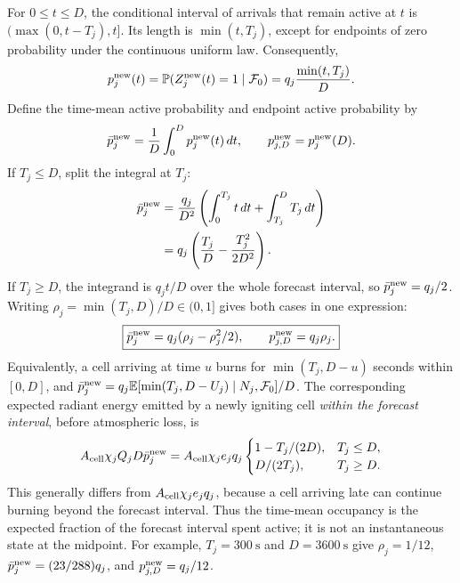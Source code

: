\documentclass[11pt,a4paper]{article}
\newcommand{\E}{\mathbb{E}}
\begin{document}
For $0\le t\le D$, the conditional interval of arrivals that remain active
at $t$ is $(\max(0,t-T_j),t]$. Its length is $\min(t,T_j)$, except for
endpoints of zero probability under the continuous uniform law. Consequently,
\begin{equation}
 p_j^{\rm new}(t)
 =\mathbb P(Z_j^{\rm new}(t)=1\mid\mathcal F_0)
 =q_j\frac{\min(t,T_j)}{D}.
 \label{eq:heat-instantaneous-occupancy}
\end{equation}
Define the time-mean active probability and endpoint active probability by
\begin{equation}
 \bar p_j^{\rm new}=\frac1D\int_0^D p_j^{\rm new}(t)\,dt,
 \qquad p_{j,D}^{\rm new}=p_j^{\rm new}(D).
\end{equation}
If $T_j\le D$, split the integral at $T_j$:
\begin{align}
 \bar p_j^{\rm new}
 &=\frac{q_j}{D^2}
      \left(\int_0^{T_j}t\,dt+\int_{T_j}^D T_j\,dt\right)\\
 &=q_j\left(\frac{T_j}{D}-\frac{T_j^2}{2D^2}\right).
\end{align}
If $T_j\ge D$, the integrand is $q_jt/D$ over the whole forecast interval,
so $\bar p_j^{\rm new}=q_j/2$. Writing
$\rho_j=\min(T_j,D)/D\in(0,1]$ gives both cases in one expression:
\begin{equation}
 \boxed{\bar p_j^{\rm new}=q_j(\rho_j-\rho_j^2/2),
 \qquad p_{j,D}^{\rm new}=q_j\rho_j.}
 \label{eq:heat-occupancy-bridge}
\end{equation}
Equivalently, a cell arriving at time $u$ burns for
$\min(T_j,D-u)$ seconds within $[0,D]$, and
$\bar p_j^{\rm new}=q_j\E[\min(T_j,D-U_j)\mid N_j,\mathcal F_0]/D$.
The corresponding expected radiant energy emitted by a newly igniting cell
\emph{within the forecast interval}, before atmospheric loss, is
\begin{equation}
 A_{\rm cell}\chi_j Q_jD\bar p_j^{\rm new}
 =A_{\rm cell}\chi_j e_jq_j
 \begin{cases}
  1-T_j/(2D),&T_j\le D,\\
  D/(2T_j),&T_j\ge D.
 \end{cases}
\end{equation}
This generally differs from $A_{\rm cell}\chi_j e_jq_j$, because a cell
arriving late can continue burning beyond the forecast interval. Thus the
time-mean occupancy is the expected fraction of the forecast interval spent
active; it is not an instantaneous state at the midpoint.
For example, $T_j=300\ \mathrm{s}$ and $D=3600\ \mathrm{s}$ give
$\rho_j=1/12$, $\bar p_j^{\rm new}=(23/288)q_j$, and
$p_{j,D}^{\rm new}=q_j/12$.
\end{document}
